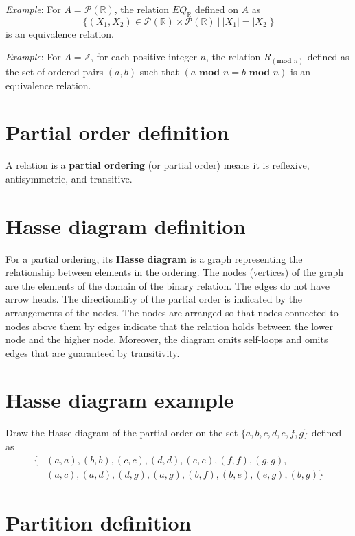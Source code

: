 \documentclass[12pt, oneside]{article}
\begin{document}
{\it Example}: For $A = \mathcal{P}(\mathbb{R})$, the relation $EQ_{\mathbb{R}}$ defined on $A$ as 
\[
\{ (X_1, X_2 ) \in\mathcal{P}(\mathbb{R})  \times \mathcal{P}(\mathbb{R}) ~|~ |X_1| = |X_2| \}
\]
is an equivalence relation.

\vfill

{\it Example}: For $A = \mathbb{Z}$, for each positive integer $n$, the relation $R_{(\textbf{mod } n)}$ defined as the set of ordered pairs $(a, b)$ such that $(a \textbf{ mod } n = b \textbf{ mod } n)$ is an equivalence relation.
\vfill \vfill
\section*{Partial order definition}


A relation is a {\bf partial ordering} (or partial order) means 
it is reflexive, antisymmetric, and transitive. \vfill
\section*{Hasse diagram definition}


For a partial ordering, its {\bf Hasse diagram} is a graph representing the 
relationship between elements in the ordering. The nodes (vertices) of the graph 
are the elements of the 
domain of the binary relation. The edges do not have arrow heads. The
directionality of the partial order is indicated by 
the arrangements of the nodes. The nodes are arranged so that nodes connected to nodes
above them by edges indicate that the relation holds between the 
lower node and the higher node. 
Moreover, the diagram omits self-loops and 
omits edges that are guaranteed by transitivity.
 \vfill
\section*{Hasse diagram example}


Draw the Hasse diagram of the partial order on the set $\{a,b,c,d,e,f,g\}$ defined as
\begin{align*}
    \{  &(a,a), (b,b), (c,c), (d,d), (e,e), (f,f), (g,g), \\
        &(a,c), (a,d), (d,g), (a,g), (b,f), (b,e), (e,g), (b,g) \}
\end{align*}

\vspace{100pt}

%
 \vfill
\section*{Partition definition}
\end{document}
